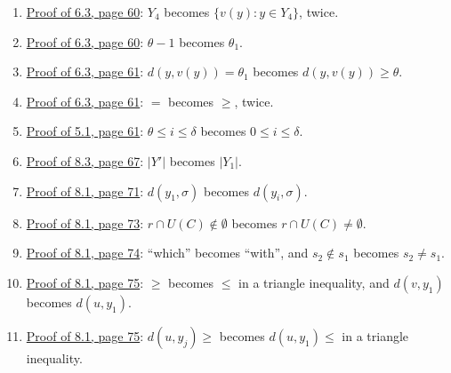\begin{enumerate}
\item {}\hyperref[fix:6.3-far-ends]{Proof of 6.3, page 60}: $Y_4$ becomes
$\{v(y) : y \in Y_4\}$, twice.
\item {}\hyperref[fix:6.3-span]{Proof of 6.3, page 60}: $\theta - 1$ becomes $\theta_1$.
\item {}\hyperref[fix:6.3-dist]{Proof of 6.3, page 61}: $d(y, v(y)) = \theta_1$ becomes
$d(y, v(y)) \ge \theta$.
\item {}\hyperref[fix:6.3-compression]{Proof of 6.3, page 61}: $=$ becomes $\ge$, twice.
\item {}\hyperref[fix:5.1-proof]{Proof of 5.1, page 61}: $\theta \le i \le \delta$ becomes
$0 \le i \le \delta$.
\item {}\hyperref[fix:8.3-proof]{Proof of 8.3, page 67}: $|Y'|$ becomes $|Y_1|$.
\item {}\hyperref[fix:8.1-p71]{Proof of 8.1, page 71}: $d(y_1, \sigma)$ becomes
$d(y_i, \sigma)$.
\item {}\hyperref[fix:8.1-p73]{Proof of 8.1, page 73}: $r \cap U(C) \notin \emptyset$ becomes
$r \cap U(C) \ne \emptyset$.
\item {}\hyperref[fix:8.1-p74]{Proof of 8.1, page 74}: ``which'' becomes ``with'', and
$s_2 \notin s_1$ becomes $s_2 \ne s_1$.
\item {}\hyperref[fix:8.1-p75a]{Proof of 8.1, page 75}: $\ge$ becomes $\le$ in a triangle
inequality, and $d(v, y_1)$ becomes $d(u, y_1)$.
\item {}\hyperref[fix:8.1-p75b]{Proof of 8.1, page 75}: $d(u, y_j) \ge$ becomes
$d(u, y_1) \le$ in a triangle inequality.
\end{enumerate}
